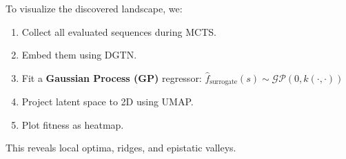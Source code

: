 \documentclass[11pt]{article}
\begin{document}
To visualize the discovered landscape, we:
\begin{enumerate}
  \item Collect all evaluated sequences during MCTS.
  \item Embed them using DGTN.
  \item Fit a \textbf{Gaussian Process (GP)} regressor: $\hat{f}_{\text{surrogate}}(s) \sim \mathcal{GP}(0, k(\cdot,\cdot))$
  \item Project latent space to 2D using UMAP.
  \item Plot fitness as heatmap.
\end{enumerate}

This reveals local optima, ridges, and epistatic valleys.



























\appendix
\end{document}
